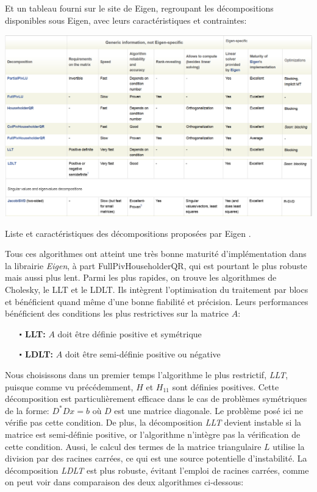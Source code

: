 \documentclass{report}
\begin{document}
Et un tableau fourni sur le site de Eigen, regroupant les décompositions disponibles sous Eigen, avec leurs caractéristiques et contraintes:

\begin{table}[H]
\centering
\includegraphics[width=\textwidth]{figs/decompositionCatalogueEigen1.png}
\includegraphics[width=\textwidth]{figs/decompositionCatalogueEigen2.png}
\caption[Table caption text]{Liste et caractéristiques des décompositions proposées par Eigen \cite{bib_eigen_tutorial_catalogue}.}
\label{table:catalogue}
\end{table}

Tous ces algorithmes ont atteint une très bonne maturité d'implémentation dans la librairie \emph{Eigen}, à part FullPivHouseholderQR, qui est pourtant le plus robuste mais aussi plus lent. Parmi les plus rapides, on trouve les algorithmes de Cholesky, le LLT et le LDLT. Ils intègrent l'optimisation du traitement par blocs et bénéficient quand même d'une bonne fiabilité et précision. Leurs performances bénéficient des conditions les plus restrictives sur la matrice $A$:
\begin{itemize}
\item[\textbf{$\centerdot$ LLT:}] $A$ doit être définie positive et symétrique
\item[\textbf{$\centerdot$ LDLT:}] $A$ doit être semi-définie positive ou négative
\end{itemize}

Nous choisissons dans un premier temps l'algorithme le plus restrictif, \emph{LLT}, puisque comme vu précédemment, $H$ et $H_{11}$ sont définies positives. Cette décomposition est particulièrement efficace dans le cas de problèmes symétriques de la forme: $D^* D x = b$ \cite{bib_eigen_LLT_desc} où $D$ est une matrice diagonale. Le problème posé ici ne vérifie pas cette condition.
De plus, la décomposition \emph{LLT} devient instable si la matrice est semi-définie positive, or l'algorithme n'intègre pas la vérification de cette condition. Aussi, le calcul des termes de la matrice triangulaire $L$ utilise la division par des racines carrées, ce qui est une source potentielle d'instabilité. La décomposition \emph{LDLT} est plus robuste, évitant l'emploi de racines carrées, comme on peut voir dans comparaison des deux algorithmes ci-dessous:
\end{document}

